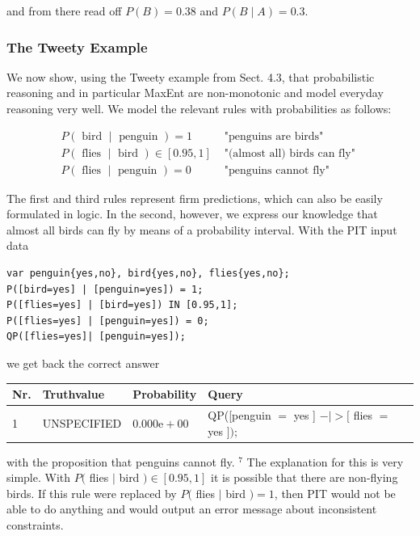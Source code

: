 \documentclass[10pt]{book}
\begin{document}
and from there read off $P(B)=0.38$ and $P(B \mid A)=0.3$.

\subsubsection*{The Tweety Example}
We now show, using the Tweety example from Sect. 4.3, that probabilistic reasoning and in particular MaxEnt are non-monotonic and model everyday reasoning very well. We model the relevant rules with probabilities as follows:

$$
\begin{array}{ll}
P(\text { bird } \mid \text { penguin })=1 & \text { "penguins are birds" } \\
P(\text { flies } \mid \text { bird }) \in[0.95,1] & \text { "(almost all) birds can fly" } \\
P(\text { flies } \mid \text { penguin })=0 & \text { "penguins cannot fly" }
\end{array}
$$

The first and third rules represent firm predictions, which can also be easily formulated in logic. In the second, however, we express our knowledge that almost all birds can fly by means of a probability interval. With the PIT input data

\begin{verbatim}
var penguin{yes,no}, bird{yes,no}, flies{yes,no};
P([bird=yes] | [penguin=yes]) = 1;
P([flies=yes] | [bird=yes]) IN [0.95,1];
P([flies=yes] | [penguin=yes]) = 0;
QP([flies=yes]| [penguin=yes]);
\end{verbatim}

we get back the correct answer

\begin{center}
\begin{tabular}{llll}
\hline
Nr. & Truthvalue & Probability & Query \\
\hline
1 & UNSPECIFIED & $0.000 \mathrm{e}+00$ & QP([penguin $=$ yes ] $-\mid>[$ flies $=$ yes $]) ;$ \\
\hline
\end{tabular}
\end{center}

with the proposition that penguins cannot fly. ${ }^{7}$ The explanation for this is very simple. With $P($ flies $\mid$ bird $) \in[0.95,1]$ it is possible that there are non-flying birds. If this rule were replaced by $P($ flies $\mid$ bird $)=1$, then PIT would not be able to do anything and would output an error message about inconsistent constraints.
\end{document}

